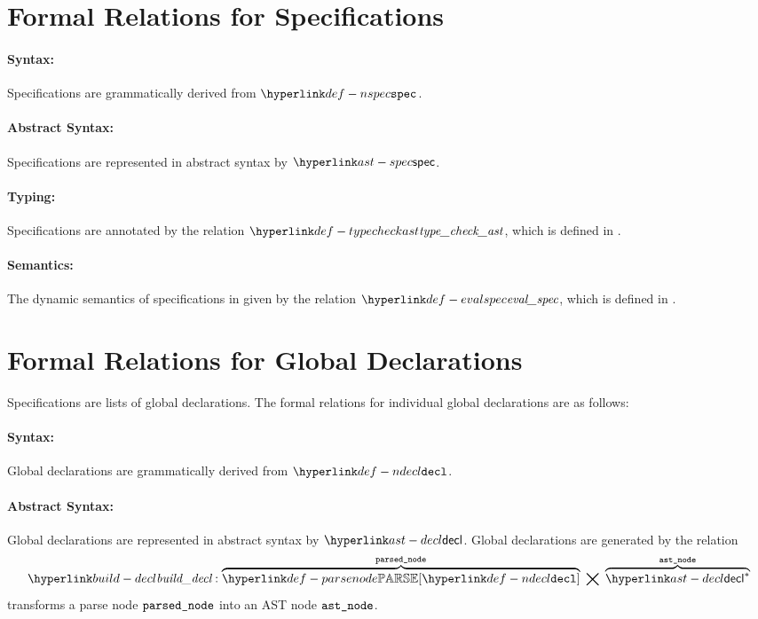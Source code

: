 \section{Formal Relations for Specifications\label{sec:Formal Relations for Specifications}}
\hypertarget{def-specificationterm}{}

\paragraph{Syntax:} Specifications are grammatically derived from $\Nspec$.
\paragraph{Abstract Syntax:} Specifications are represented in abstract syntax by $\spec$.
\paragraph{Typing:} Specifications are annotated by the relation $\typecheckast$, which is defined in
  .
\paragraph{Semantics:} The dynamic semantics of specifications in given by the relation $\evalspec$,
  which is defined in .

\section{Formal Relations for Global Declarations\label{sec:Formal Relations for Global Declarations}}
Specifications are lists of global declarations.
The formal relations for individual global declarations are as follows:

\paragraph{Syntax:} Global declarations are grammatically derived from $\Ndecl$.

\paragraph{Abstract Syntax:} Global declarations are represented in abstract syntax by $\decl$.
Global declarations are generated by the relation
\hypertarget{build-decl}{}
\[
  \builddecl : \overname{\parsenode{\Ndecl}}{\vparsednode} \;\aslrel\; \overname{\decl^*}{\vastnode}
\]
transforms a parse node $\texttt{parsed\_node}$ into an AST node $\texttt{ast\_node}$.

